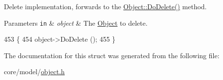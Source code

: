 Delete implementation, forwards to the \hyperlink{classns3_1_1Object_a757cb898d51f92239be9d1309d16a972}{Object\+::\+Do\+Delete()} method.


\begin{DoxyParams}[1]{Parameters}
\mbox{\tt in}  & {\em object} & The \hyperlink{classns3_1_1Object}{Object} to delete. \\
\hline
\end{DoxyParams}

\begin{DoxyCode}
453 \{
454   \textcolor{keywordtype}{object}->DoDelete ();
455 \}
\end{DoxyCode}


The documentation for this struct was generated from the following file\+:\begin{DoxyCompactItemize}
\item 
core/model/\hyperlink{object_8h}{object.\+h}\end{DoxyCompactItemize}
